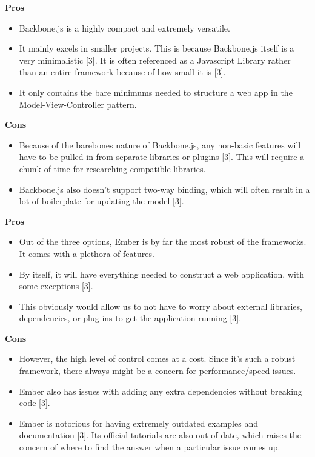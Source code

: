 	\textbf{Pros}	
			\begin{itemize}
				\item Backbone.js is a highly compact and extremely versatile. 
				\item It mainly excels in smaller projects. This is because Backbone.js itself is a very minimalistic [3]. It is often referenced as a Javascript Library rather than an entire framework because of how small it is [3]. 
				\item It only contains the bare minimums needed to structure a web app in the Model-View-Controller pattern.
			\end{itemize}
	\textbf{Cons}
		\begin{itemize}
			\item Because of the barebones nature of Backbone.js, any non-basic features will have to be pulled in from separate libraries or plugins [3]. This will require a chunk of time for researching compatible libraries. 
			\item Backbone.js also doesn't support two-way binding, which will often result in a lot of boilerplate for updating the model [3].
		\end{itemize}
	
		\textbf{Pros}
			\begin{itemize}
				\item Out of the three options, Ember is by far the most robust of the frameworks. It comes with a plethora of features. 
				\item By itself, it will have everything needed to construct a web application, with some exceptions [3]. 
				\item This obviously would allow us to not have to worry about external libraries, dependencies, or plug-ins to get the application running [3].
			\end{itemize}
		\textbf{Cons}
			\begin{itemize}
				\item However, the high level of control comes at a cost. Since it's such a robust framework, there always might be a concern for performance/speed issues. 
				\item Ember also has issues with adding any extra dependencies without breaking code [3].
				\item Ember is notorious for having extremely outdated examples and documentation [3]. Its official tutorials are also out of date, which raises the concern of where to find the answer when a particular issue comes up.
			\end{itemize}	

